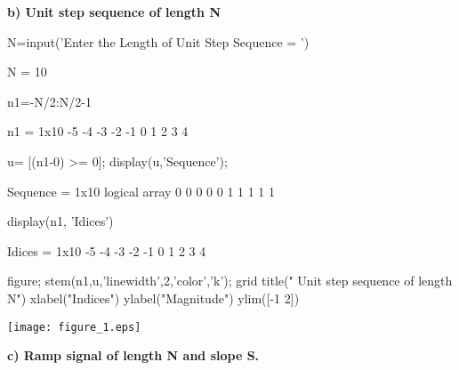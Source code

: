 \documentclass[12pt, onecolumn]{IEEEtran}
\begin{document}
	\begin{par}
		\begin{flushleft}
			\textbf{b) Unit step sequence of length N}
		\end{flushleft}
	\end{par}
	
	\begin{matlabcode}
		N=input('Enter the Length of Unit Step Sequence = ')
	\end{matlabcode}
	\begin{matlaboutput}
		N = 10
	\end{matlaboutput}
	\begin{matlabcode}
		n1=-N/2:N/2-1
	\end{matlabcode}
	\begin{matlaboutput}
		n1 = 1x10    
		-5    -4    -3    -2    -1     0     1     2     3     4
		
	\end{matlaboutput}
	\begin{matlabcode}
		u= [(n1-0) >= 0];
		display(u,'Sequence');
	\end{matlabcode}
	\begin{matlaboutput}
		Sequence = 1x10 logical array    
		0   0   0   0   0   1   1   1   1   1
		
	\end{matlaboutput}
	\begin{matlabcode}
		display(n1, 'Idices')
	\end{matlabcode}
	\begin{matlaboutput}
		Idices = 1x10    
		-5    -4    -3    -2    -1     0     1     2     3     4
		
	\end{matlaboutput}
	\begin{matlabcode}
		figure;
		stem(n1,u,'linewidth',2,'color','k'); grid
		title(" Unit step sequence of length N")
		xlabel("Indices")
		ylabel("Magnitude")
		ylim([-1 2])
	\end{matlabcode}
	\begin{center}
		\texttt{[image: figure\_1.eps]}
	\end{center}
	\begin{matlabcode}
		
	\end{matlabcode}
	
	\begin{par}
		\begin{flushleft}
			\textbf{c) Ramp signal of length N and slope S.}
		\end{flushleft}
	\end{par}
	
\end{document}

